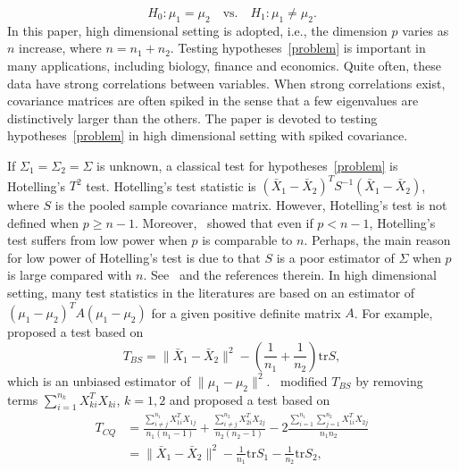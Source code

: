 \documentclass[review]{elsarticle}
\theoremstyle{plain}
\theoremstyle{definition}
\theoremstyle{remark}
\begin{document}
\begin{equation}\label{problem}
    H_0:\mu_1=\mu_2\quad \textrm{vs.}\quad H_1:\mu_1\neq \mu_2.
\end{equation}
 In this paper, high dimensional setting is adopted, i.e., the dimension $p$ varies as $n$ increase, where $n=n_1+n_2$.
Testing hypotheses~\eqref{problem} is important in many applications, including biology, finance and economics. Quite often,  these data have strong correlations between variables. When strong correlations exist, covariance matrices are often spiked in the sense that a few eigenvalues are distinctively larger than the others. The paper is devoted to
testing hypotheses~\eqref{problem} in high dimensional setting with spiked covariance.


If $\Sigma_1=\Sigma_2=\Sigma$ is unknown, a classical test for hypotheses~\eqref{problem} is Hotelling's $T^2$ test.  Hotelling's test statistic is ${(\bar{X}_1-\bar{X}_2)}^T S^{-1}(\bar{X}_1-\bar{X}_2)$, where $S$ is the pooled sample covariance matrix. However, Hotelling's test is not defined when $p\geq n-1$.
Moreover,~\cite{Bai1996Efiect} showed that even if $p<n-1$, Hotelling's test suffers from low power when $p$ is comparable to $n$.
Perhaps, the main reason for low power of Hotelling's test is due to that $S$ is a poor estimator of $\Sigma$ when $p$ is large compared with $n$. See~\cite{Chen2010A} and the references therein.
In high dimensional setting,  
many test statistics in the literatures are based on an estimator of ${(\mu_1-\mu_2)}^T A(\mu_1-\mu_2)$ for a given positive definite matrix $A$. 
For example,~\cite{Bai1996Efiect} proposed a test based on
\begin{equation*}
    T_{BS}=\|\bar{X}_1-\bar{X}_2\|^2-(\frac{1}{n_1}+\frac{1}{n_2})\mathrm{tr}S,
\end{equation*}
which is an unbiased estimator of $\|\mu_1-\mu_2\|^2$.~\cite{Chen2010A} modified $T_{BS}$ by removing terms $\sum_{i=1}^{n_k}X_{ki}^T X_{ki}$, $k=1,2$ and proposed a test based on
\begin{equation*}
    \begin{aligned}
        T_{CQ}&=\frac{\sum_{i\neq j}^{n_1}X_{1i}^T X_{1j}}{n_1(n_1-1)}+\frac{\sum_{i\neq j}^{n_2}X_{2i}^T X_{2j}}{n_2(n_2-1)}-2\frac{\sum_{i=1}^{n_1}\sum_{j=1}^{n_2}X_{1i}^T X_{2j}}{n_1n_2}
        \\
            &=\|\bar{X}_1-\bar{X}_2\|^2-\frac{1}{n_1}\mathrm{tr}S_1-\frac{1}{n_2}\mathrm{tr}S_2,
    \end{aligned}
\end{equation*}
\end{document}

